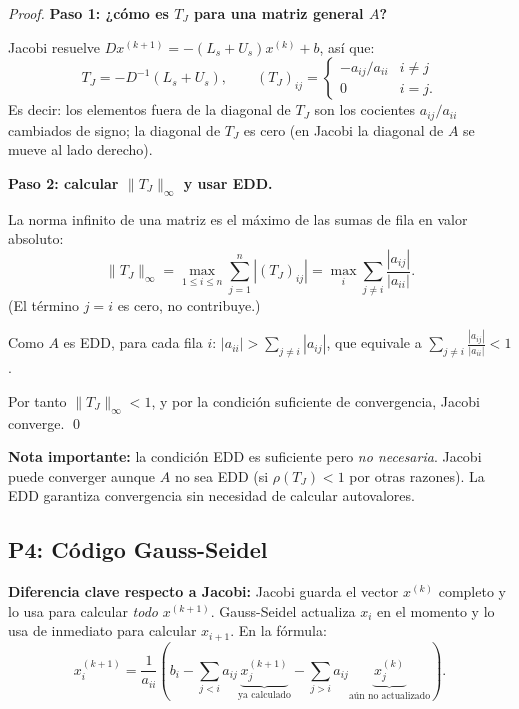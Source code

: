 \documentclass[11pt,a4paper]{article}
\begin{document}
\begin{proof}
\textbf{Paso 1: ¿cómo es $T_J$ para una matriz general $A$?}

Jacobi resuelve $Dx^{(k+1)}=-(L_s+U_s)x^{(k)}+b$, así que:
\[
  T_J = -D^{-1}(L_s+U_s), \qquad (T_J)_{ij} = \begin{cases}-a_{ij}/a_{ii} & i\ne j\\ 0 & i=j.\end{cases}
\]
Es decir: los elementos fuera de la diagonal de $T_J$ son los cocientes $a_{ij}/a_{ii}$ cambiados de signo; la diagonal de $T_J$ es cero (en Jacobi la diagonal de $A$ se mueve al lado derecho).

\textbf{Paso 2: calcular $\|T_J\|_\infty$ y usar EDD.}

La norma infinito de una matriz es el máximo de las sumas de fila en valor absoluto:
\[
  \|T_J\|_\infty = \max_{1\le i\le n}\sum_{j=1}^n|(T_J)_{ij}|
  = \max_i \sum_{j\ne i}\frac{|a_{ij}|}{|a_{ii}|}.
\]
(El término $j=i$ es cero, no contribuye.)

Como $A$ es EDD, para cada fila $i$: $|a_{ii}|>\sum_{j\ne i}|a_{ij}|$, que equivale a $\sum_{j\ne i}\frac{|a_{ij}|}{|a_{ii}|}<1$.

Por tanto $\|T_J\|_\infty<1$, y por la condición suficiente de convergencia, Jacobi converge. \qed
\end{proof}

\textbf{Nota importante:} la condición EDD es suficiente pero \emph{no necesaria}. Jacobi puede converger aunque $A$ no sea EDD (si $\rho(T_J)<1$ por otras razones). La EDD garantiza convergencia sin necesidad de calcular autovalores.

\subsection{P4: Código Gauss-Seidel}
\label{sec:q2_2016_p4}

\textbf{Diferencia clave respecto a Jacobi:} Jacobi guarda el vector $x^{(k)}$ completo y lo usa para calcular \emph{todo} $x^{(k+1)}$. Gauss-Seidel actualiza $x_i$ en el momento y lo usa de inmediato para calcular $x_{i+1}$. En la fórmula:
\[
  x_i^{(k+1)} = \frac{1}{a_{ii}}\!\left(b_i - \sum_{j<i}a_{ij}\underbrace{x_j^{(k+1)}}_{\text{ya calculado}} - \sum_{j>i}a_{ij}\underbrace{x_j^{(k)}}_{\text{aún no actualizado}}\right).
\]
\end{document}
